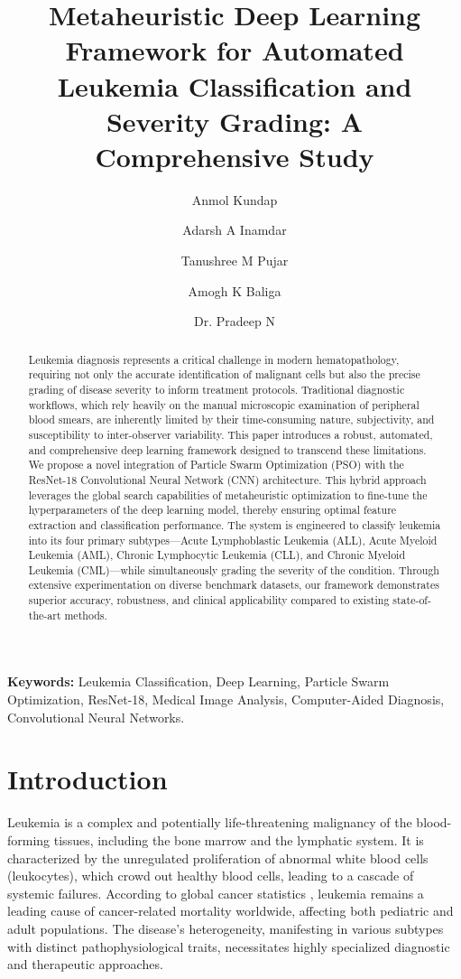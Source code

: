 \documentclass[11pt, a4paper]{article}
\title{Metaheuristic Deep Learning Framework for Automated Leukemia Classification and Severity Grading: A Comprehensive Study}
\author[1]{Anmol Kundap}
\author[1]{Adarsh A Inamdar}
\author[1]{Tanushree M Pujar}
\author[1]{Amogh K Baliga}
\author[1]{Dr. Pradeep N}
\affil[1]{Department of Computer Science and Engineering, Bapuji Institute of Engineering and Technology, Davangere, Karnataka, India\protect\\
\texttt{\{anmolkundap2004, eradarshainamdar, tanushreempujar, amoghbaliga254257, nmnpradeep\}@gmail.com}}
\date{}
\begin{document}
\maketitle

\begin{abstract}
Leukemia diagnosis represents a critical challenge in modern hematopathology, requiring not only the accurate identification of malignant cells but also the precise grading of disease severity to inform treatment protocols. Traditional diagnostic workflows, which rely heavily on the manual microscopic examination of peripheral blood smears, are inherently limited by their time-consuming nature, subjectivity, and susceptibility to inter-observer variability. This paper introduces a robust, automated, and comprehensive deep learning framework designed to transcend these limitations. We propose a novel integration of Particle Swarm Optimization (PSO) with the ResNet-18 Convolutional Neural Network (CNN) architecture. This hybrid approach leverages the global search capabilities of metaheuristic optimization to fine-tune the hyperparameters of the deep learning model, thereby ensuring optimal feature extraction and classification performance. The system is engineered to classify leukemia into its four primary subtypes—Acute Lymphoblastic Leukemia (ALL), Acute Myeloid Leukemia (AML), Chronic Lymphocytic Leukemia (CLL), and Chronic Myeloid Leukemia (CML)—while simultaneously grading the severity of the condition. Through extensive experimentation on diverse benchmark datasets, our framework demonstrates superior accuracy, robustness, and clinical applicability compared to existing state-of-the-art methods.
\end{abstract}

\textbf{Keywords:} Leukemia Classification, Deep Learning, Particle Swarm Optimization, ResNet-18, Medical Image Analysis, Computer-Aided Diagnosis, Convolutional Neural Networks.

\section{Introduction}

Leukemia is a complex and potentially life-threatening malignancy of the blood-forming tissues, including the bone marrow and the lymphatic system. It is characterized by the unregulated proliferation of abnormal white blood cells (leukocytes), which crowd out healthy blood cells, leading to a cascade of systemic failures. According to global cancer statistics \cite{r1, r14}, leukemia remains a leading cause of cancer-related mortality worldwide, affecting both pediatric and adult populations. The disease's heterogeneity, manifesting in various subtypes with distinct pathophysiological traits, necessitates highly specialized diagnostic and therapeutic approaches.
\end{document}
